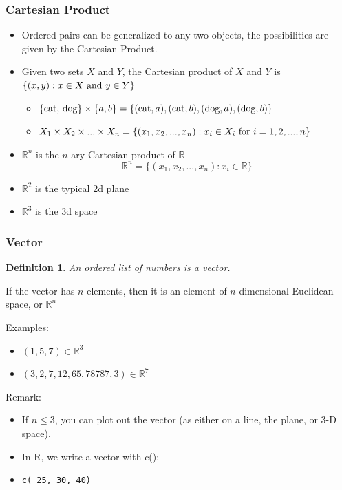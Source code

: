 \documentclass[aspectratio=169]{beamer}
\newtheorem{defn}{Definition}
\numberwithin{equation}{section}
\begin{document}
\begin{frame}
\frametitle{Cartesian Product}

\begin{itemize}
\item Ordered pairs can be generalized to any two objects, the possibilities are given by the Cartesian Product.

\item Given two sets $X$ and $Y$, the Cartesian product of $X$ and $Y$ is $\{(x, y): x\in X \hbox{ and }y\in Y\}$

\begin{itemize}
\item $\{\hbox{cat, dog}\}\times \{a, b\}= \{(\hbox{cat}, a), (\hbox{cat}, b), (\hbox{dog}, a), (\hbox{dog}, b)\}$ \pause
\item $X_1\times X_2\times ... \times X_n=\{(x_1, x_2, ..., x_n):x_i\in X_i \hbox{ for }i=1, 2, ..., n\}$ \pause
\end{itemize}
\end{itemize}

\begin{itemize}
\item $\mathbb{R}^n$ is the $n$-ary Cartesian product of $\mathbb{R}$
$$\mathbb{R}^n=\{(x_1, x_2, ..., x_n): x_i\in \mathbb{R} \}$$
\item $\mathbb{R}^2$ is the typical 2d plane
\item $\mathbb{R}^3$ is the 3d space
\end{itemize}

\end{frame}







\begin{frame}
\frametitle{Vector}

\begin{defn}
An ordered list of numbers is a \textit{vector}.
\end{defn}
\pause

If the vector has $n$ elements, then it is an element of $n$-dimensional Euclidean space, or $\mathbb{R}^n$ \pause

{Examples: }
\begin{itemize}
\item $(1, 5, 7)\in \mathbb{R}^3$
\item $(3, 2, 7, 12, 65, 78787, 3)\in \mathbb{R}^7$ \pause
\end{itemize}

{Remark: }
\begin{itemize}
\item If $n\leq 3$, you can plot out the vector (as either on a line, the plane, or 3-D space).
\item In R, we write a vector with c():
\item[] \texttt{c( 25, 30, 40)}
\end{itemize}

\end{frame}
\end{document}

